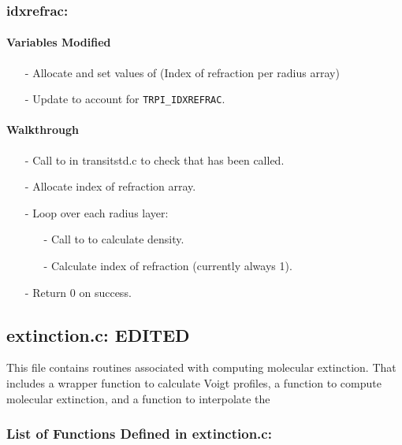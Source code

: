 \documentclass[letterpaper,12pt]{article}
\begin{document}
\subsubsection{idxrefrac:}
\paragraph{Variables Modified}
\begin{enumerate}[leftmargin=10pt, noitemsep, parsep=0pt, topsep=0ex]
\item[-] Allocate and set values of  (Index of
  refraction per radius array)
\item[-] Update  to account for {\tt TRPI\_IDXREFRAC}.
\end{enumerate}

\paragraph{Walkthrough}
\begin{enumerate}[leftmargin=10pt, noitemsep, parsep=0pt, topsep=0ex]
\item[-] Call to  in transitstd.c to check that  has been called.
\item[-] Allocate index of refraction array.
\item[-] Loop over each radius layer:
\begin{enumerate}[leftmargin=10pt, noitemsep, parsep=0pt, topsep=0ex]
\item[-] Call to   to calculate density.
\item[-] Calculate index of refraction (currently always 1).
\end{enumerate}
\item[-] Return 0 on success.
\end{enumerate}

\newpage
\subsection{extinction.c: EDITED}
This file contains routines associated with computing molecular extinction. That includes a wrapper function to calculate Voigt profiles, a function to compute molecular extinction, and a function to interpolate the 
\subsubsection{ List of Functions Defined in extinction.c:}
 \\
\end{document}
